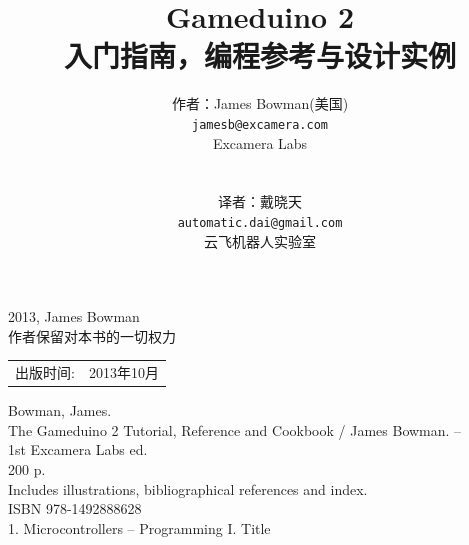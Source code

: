 \documentclass[10pt]{book}
\title{\LARGE \bf
Gameduino 2\\
入门指南，编程参考与设计实例
}
\author{作者：James Bowman(美国) \\
	{\tt\small jamesb@excamera.com} \\
  Excamera Labs\\
   \\
   \\
  译者：戴晓天\\
  {\tt\small automatic.dai@gmail.com} \\
  云飞机器人实验室
}
\date{}
\begin{document}
\begin{CJK}{UTF8}{gkai}
\maketitle

\begingroup
\footnotesize
\parindent 0pt
\parskip \baselineskip
\textcopyright{} 2013, James Bowman \\
作者保留对本书的一切权力

% 
% 
% 
% 

\begin{center}
\begin{tabular}{ll}
出版时间:  & 2013年10月 \\
\end{tabular}
\end{center}

\vfill

Bowman, James.\\
\hspace*{2em} The Gameduino 2 Tutorial, Reference and Cookbook / James Bowman. -- \\
\hspace*{1em} 1st Excamera Labs ed. \\
\hspace*{2em} 200 p. \hspace*{2em} \\
\hspace*{2em} Includes illustrations, bibliographical references and index. \\
\hspace*{2em} ISBN 978-1492888628 \\
\hspace*{2em} 1. Microcontrollers -- Programming \hspace*{2em} I. Title



\end{CJK}
\end{document}

